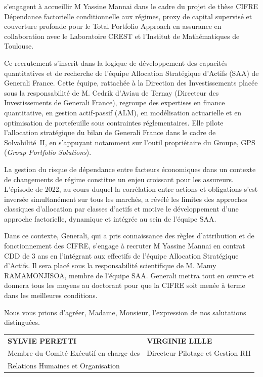 \documentclass[10pt,a4paper]{article}
\begin{document}
s'engagent à accueillir M Yassine Mannai dans le cadre du projet de thèse CIFRE
\og Dépendance factorielle conditionnelle aux régimes, proxy de capital supervisé et couverture profonde pour le Total Portfolio Approach en assurance \fg{}
en collaboration avec le Laboratoire CREST et l'Institut de Math\'{e}matiques de Toulouse.

Ce recrutement s'inscrit dans la logique de développement des capacités
quantitatives et de recherche de l'équipe Allocation Stratégique d'Actifs (SAA)
de Generali France. Cette équipe, rattachée à la Direction des Investissements
placée sous la responsabilité de M. Cedrik d'Aviau de Ternay (Directeur des
Investissements de Generali France), regroupe des expertises en finance
quantitative, en gestion actif-passif (ALM), en modélisation actuarielle et
en optimisation de portefeuille sous contraintes réglementaires. Elle pilote
l'allocation stratégique du bilan de Generali France dans le cadre de Solvabilité~II,
en s'appuyant notamment sur l'outil propriétaire du Groupe, GPS (\textit{Group
Portfolio Solutions}).

La gestion du risque de dépendance entre facteurs économiques dans un contexte de
changements de régime constitue un enjeu croissant pour les assureurs. L'épisode
de 2022, au cours duquel la corrélation entre actions et obligations s'est inversée
simultanément sur tous les marchés, a révélé les limites des approches classiques
d'allocation par classes d'actifs et motive le développement d'une approche
factorielle, dynamique et intégrée au sein de l'équipe SAA.

Dans ce contexte, Generali, qui a pris connaissance des règles d'attribution et de
fonctionnement des CIFRE, s'engage à recruter M Yassine Mannai en contrat CDD de
3 ans en l'intégrant aux effectifs de l'équipe Allocation Stratégique d'Actifs. Il
sera placé sous la responsabilité scientifique de M. Mamy RAMAMONJISOA, membre de
l'équipe SAA. Generali mettra tout en \oe{}uvre et donnera tous les moyens au
doctorant pour que la CIFRE soit menée à terme dans les meilleures conditions.

\medskip

Nous vous prions d'agréer, Madame, Monsieur, l'expression de nos salutations
distinguées.

\vspace{2cm}

\noindent
\begin{tabularx}{\textwidth}{@{}X X@{}}
\textbf{SYLVIE PERETTI} & \textbf{VIRGINIE LILLE} \\[4pt]
Membre du Comité Exécutif en charge des & Directeur Pilotage et Gestion RH \\
Relations Humaines et Organisation & \\
\end{tabularx}
\end{document}
